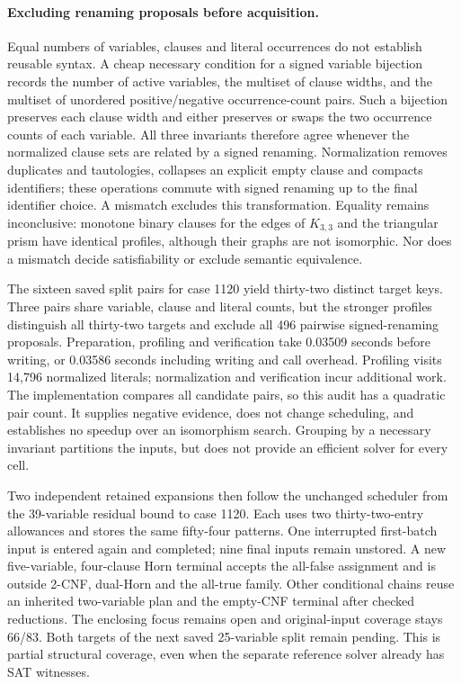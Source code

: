 \documentclass[11pt,a4paper]{article}
\numberwithin{equation}{section}
\theoremstyle{plain}
\theoremstyle{definition}
\theoremstyle{remark}
\begin{document}
\paragraph{Excluding renaming proposals before acquisition.}
Equal numbers of variables, clauses and literal occurrences do not establish reusable syntax. A cheap necessary condition for a signed variable bijection records the number of active variables, the multiset of clause widths, and the multiset of unordered positive/negative occurrence-count pairs. Such a bijection preserves each clause width and either preserves or swaps the two occurrence counts of each variable. All three invariants therefore agree whenever the normalized clause sets are related by a signed renaming. Normalization removes duplicates and tautologies, collapses an explicit empty clause and compacts identifiers; these operations commute with signed renaming up to the final identifier choice. A mismatch excludes this transformation. Equality remains inconclusive: monotone binary clauses for the edges of $K_{3,3}$ and the triangular prism have identical profiles, although their graphs are not isomorphic. Nor does a mismatch decide satisfiability or exclude semantic equivalence.

The sixteen saved split pairs for case 1120 yield thirty-two distinct target keys. Three pairs share variable, clause and literal counts, but the stronger profiles distinguish all thirty-two targets and exclude all 496 pairwise signed-renaming proposals. Preparation, profiling and verification take 0.03509 seconds before writing, or 0.03586 seconds including writing and call overhead. Profiling visits 14,796 normalized literals; normalization and verification incur additional work. The implementation compares all candidate pairs, so this audit has a quadratic pair count. It supplies negative evidence, does not change scheduling, and establishes no speedup over an isomorphism search. Grouping by a necessary invariant partitions the inputs, but does not provide an efficient solver for every cell.

Two independent retained expansions then follow the unchanged scheduler from the 39-variable residual bound to case 1120. Each uses two thirty-two-entry allowances and stores the same fifty-four patterns. One interrupted first-batch input is entered again and completed; nine final inputs remain unstored. A new five-variable, four-clause Horn terminal accepts the all-false assignment and is outside 2-CNF, dual-Horn and the all-true family. Other conditional chains reuse an inherited two-variable plan and the empty-CNF terminal after checked reductions. The enclosing focus remains open and original-input coverage stays 66/83. Both targets of the next saved 25-variable split remain pending. This is partial structural coverage, even when the separate reference solver already has SAT witnesses.
\end{document}
